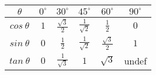 \begin{table}[H]
\begin{center}
\setlength{\extrarowheight}{2.5pt}

\begin{tabular}{|c|c|c|c|c|c|}\hline
$\theta$
&
${0}^{\circ }$
&
${30}^{\circ }$
&
${45}^{\circ }$
&
${60}^{\circ }$
&
${90}^{\circ }$



\\ \hline
$cos~ \theta $
 &
$1$
&
$\frac{\sqrt{3}}{2}$
&
$\frac{1}{\sqrt{2}}$
&
$\frac{1}{2}$
&
$0$


\\ \hline
$sin~ \theta $
&
$0$
&
$\frac{1}{2} $
&
$\frac{1}{\sqrt{2}}$
&
$\frac{\sqrt{3}}{2}$
&
$1$

\\ \hline
$tan~ \theta $
&
$0$
&
$\frac{1}{\sqrt{3}}$
&
$1$ &
$\sqrt{3}$
&
undef


\\ \hline
\end{tabular}
\end{center}
\end{table}




